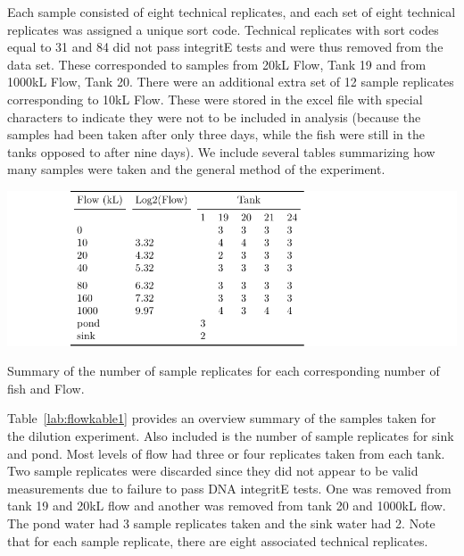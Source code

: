 \vspace{5mm}

Each sample consisted of eight technical replicates, and each set of eight technical replicates was assigned a unique sort code. Technical replicates with sort codes equal to 31 and 84 did not pass integritE tests and were thus removed from the data set. These corresponded to samples from 20kL Flow, Tank 19 and from 1000kL Flow, Tank 20. There were an additional extra set of 12 sample replicates corresponding to 10kL Flow. These were stored in the excel file with special characters to indicate they were not to be included in analysis (because the samples had been taken after only three days, while the fish were still in the tanks opposed to after nine days). We include several tables summarizing how many samples were taken and the general method of the experiment.


\begin{table}[H]
\includegraphics{Chapter4Images/flowkable1.pdf}
\caption{Summary of the number of sample replicates for each corresponding number of fish and Flow.}
\label{lab:flowkable1}
\end{table}

Table~\ref{lab:flowkable1} provides an overview summary of the samples taken for the dilution experiment. Also included is the number of sample replicates for sink and pond. Most levels of flow had three or four replicates taken from each tank. Two sample replicates were discarded since they did not appear to be valid measurements due to failure to pass DNA integritE tests. One was removed from tank 19 and 20kL flow and another was removed from tank 20 and 1000kL flow. The pond water had 3 sample replicates taken and the sink water had 2.
Note that for each sample replicate, there are eight associated technical replicates.



